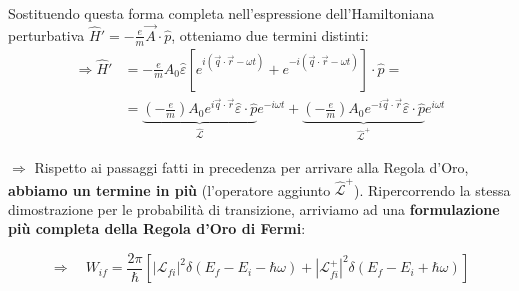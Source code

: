\documentclass[11pt, a4paper]{article}
\begin{document}
\noindent
Sostituendo questa forma completa nell'espressione dell'Hamiltoniana perturbativa $\hat{H}' = -\frac{e}{m}\vec{A}\cdot\hat{p}$, otteniamo due termini distinti: %
\begin{align*}
    \Rightarrow \hat{H}' &= -\frac{e}{m} A_0 \hat{\varepsilon} \left[ e^{i(\vec{q}\cdot\vec{r} - \omega t)} + e^{-i(\vec{q}\cdot\vec{r} - \omega t)} \right] \cdot \hat{p} = \\ %
    &= \underbrace{ \left(-\frac{e}{m}\right) A_0 e^{i\vec{q}\cdot\vec{r}} \hat{\varepsilon} \cdot \hat{p} }_{\hat{\mathcal{L}}} e^{-i\omega t} + \underbrace{ \left(-\frac{e}{m}\right) A_0 e^{-i\vec{q}\cdot\vec{r}} \hat{\varepsilon} \cdot \hat{p} }_{\hat{\mathcal{L}}^+} e^{i\omega t} %
\end{align*}

$\Rightarrow$ Rispetto ai passaggi fatti in precedenza per arrivare alla Regola d'Oro, \textbf{abbiamo un termine in più} (l'operatore aggiunto $\hat{\mathcal{L}}^+$). %
Ripercorrendo la stessa dimostrazione per le probabilità di transizione, arriviamo ad una \textbf{formulazione più completa della Regola d'Oro di Fermi}: %

\begin{equation}
    \Rightarrow \quad W_{if} = \frac{2\pi}{\hbar} \left[ |\mathcal{L}_{fi}|^2 \delta(E_f - E_i - \hbar\omega) + |\mathcal{L}_{fi}^+|^2 \delta(E_f - E_i + \hbar\omega) \right] %
\end{equation}
\end{document}
